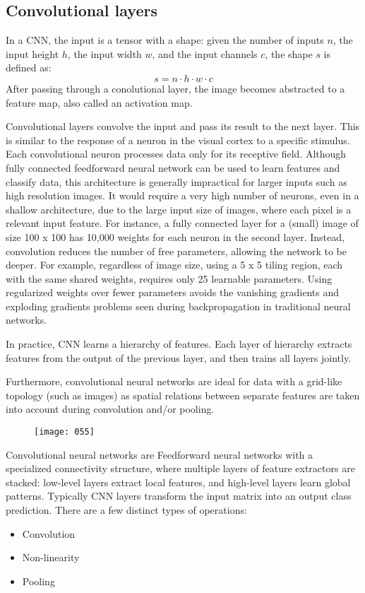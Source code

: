 \subsection{Convolutional layers}
In a CNN, the input is a tensor with a shape: given the number of inputs \(n\), the input height \(h\), the input width \(w\), and the input channels \(c\), the shape \(s\) is defined as:
\begin{equation}
    s = n \cdot h \cdot w \cdot c
\end{equation}
After passing through a conolutional layer, the image becomes abstracted to a feature map, also called an activation map.

Convolutional layers convolve the input and pass its result to the next layer. This is similar to the response of a neuron in the visual cortex to a specific stimulus. Each convolutional neuron processes data only for its receptive field. Although fully connected feedforward neural network can be used to learn features and classify data, this architecture is generally impractical for larger inputs such as high resolution images. It would require a very high number of neurons, even in a shallow architecture, due to the large input size of images, where each pixel is a relevant input feature. For instance, a fully connected layer for a (small) image of size 100 x 100 has 10,000 weights for each neuron in the second layer. Instead, convolution reduces the number of free parameters, allowing the network to be deeper. For example, regardless of image size, using a 5 x 5 tiling region, each with the same shared weights, requires only 25 learnable parameters. Using regularized weights over fewer parameters avoids the vanishing gradients and exploding gradients problems seen during backpropagation in traditional neural networks.

In practice, CNN learns a hierarchy of features. Each layer of hierarchy extracts features from the output of the previous layer, and then trains all layers jointly.

Furthermore, convolutional neural networks are ideal for data with a grid-like topology (such as images) as spatial relations between separate features are taken into account during convolution and/or pooling.

\begin{figure}[h!]
    \centering
    \texttt{[image: 055]}
    \caption{}
    \label{fig:055}
\end{figure}

Convolutional neural networks are Feedforward neural networks with a specialized connectivity structure, where multiple layers of feature extractors are stacked: low-level layers extract local features, and high-level layers learn global patterns. Typically CNN layers transform the input matrix into an output class prediction. There are a few distinct types of operations:
\begin{itemize}[topsep={0pt}, partopsep={0pt}]
    \itemsep0pt
    \item Convolution
    \item Non-linearity
    \item Pooling
\end{itemize}

